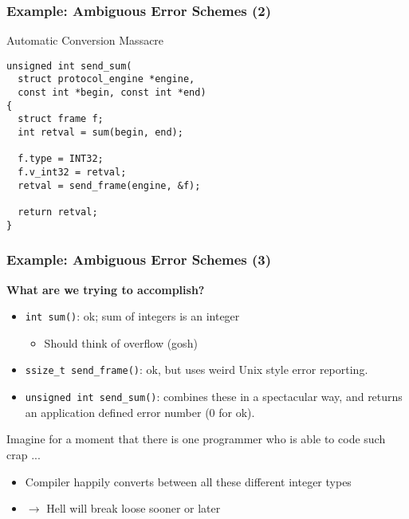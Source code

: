 \begin{frame}[fragile]
  \frametitle{Example: Ambiguous Error Schemes (2)}

  \begin{block}{Automatic Conversion Massacre}
\begin{verbatim}
unsigned int send_sum(
  struct protocol_engine *engine,
  const int *begin, const int *end)
{
  struct frame f;
  int retval = sum(begin, end);

  f.type = INT32;
  f.v_int32 = retval;
  retval = send_frame(engine, &f);

  return retval;
}
\end{verbatim}
  \end{block}

\end{frame}

\begin{frame}
  \frametitle{Example: Ambiguous Error Schemes (3)}

  \textbf{What are we trying to accomplish?}

  \begin{itemize}
  \item \texttt{int sum()}: ok; sum of integers is an integer
    \begin{itemize}
    \item Should think of overflow (gosh)
    \end{itemize}
  \item \texttt{ssize\_t send\_frame()}: ok, but uses weird Unix style
    error reporting.
  \item \texttt{unsigned int send\_sum()}: combines these in a
    spectacular way, and returns an application defined error number
    (0 for ok).
  \end{itemize}

  Imagine for a moment that there is one programmer who is able to
  code such crap ...

  \begin{itemize}
  \item Compiler happily converts between all these different integer
    types
  \item $\to$ Hell will break loose sooner or later
  \end{itemize}

\end{frame}

